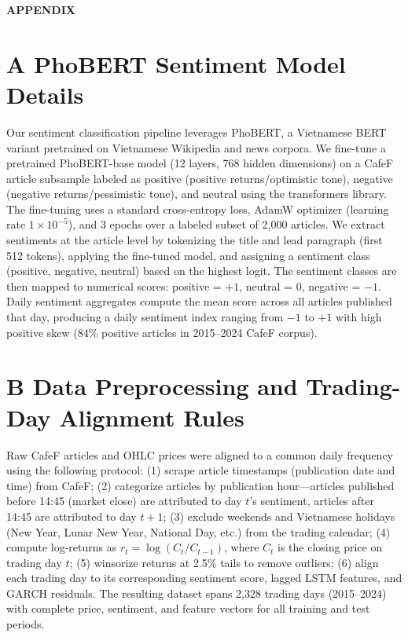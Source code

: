 \vspace*{2cm}
\begin{center}
\Large\textbf{APPENDIX}
\end{center}
\vspace{1.5cm}

\section*{A \quad PhoBERT Sentiment Model Details}

Our sentiment classification pipeline leverages PhoBERT, a Vietnamese BERT variant pretrained on Vietnamese Wikipedia and news corpora. We fine-tune a pretrained PhoBERT-base model (12 layers, 768 hidden dimensions) on a CafeF article subsample labeled as positive (positive returns/optimistic tone), negative (negative returns/pessimistic tone), and neutral using the transformers library. The fine-tuning uses a standard cross-entropy loss, AdamW optimizer (learning rate $1 \times 10^{-5}$), and 3 epochs over a labeled subset of 2,000 articles. We extract sentiments at the article level by tokenizing the title and lead paragraph (first 512 tokens), applying the fine-tuned model, and assigning a sentiment class (positive, negative, neutral) based on the highest logit. The sentiment classes are then mapped to numerical scores: positive = \(+1\), neutral = \(0\), negative = \(-1\). Daily sentiment aggregates compute the mean score across all articles published that day, producing a daily sentiment index ranging from $-1$ to $+1$ with high positive skew (84\% positive articles in 2015--2024 CafeF corpus).

\section*{B \quad Data Preprocessing and Trading-Day Alignment Rules}

Raw CafeF articles and OHLC prices were aligned to a common daily frequency using the following protocol: (1) scrape article timestamps (publication date and time) from CafeF; (2) categorize articles by publication hour—articles published before 14:45 (market close) are attributed to day $t$'s sentiment, articles after 14:45 are attributed to day $t+1$; (3) exclude weekends and Vietnamese holidays (New Year, Lunar New Year, National Day, etc.) from the trading calendar; (4) compute log-returns as $r_t = \log(C_t / C_{t-1})$, where $C_t$ is the closing price on trading day $t$; (5) winsorize returns at 2.5\% tails to remove outliers; (6) align each trading day to its corresponding sentiment score, lagged LSTM features, and GARCH residuals. The resulting dataset spans 2,328 trading days (2015--2024) with complete price, sentiment, and feature vectors for all training and test periods.

